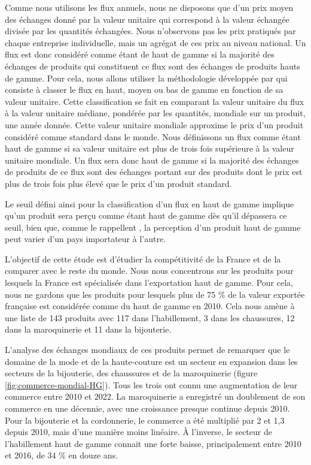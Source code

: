\documentclass[french,10pt,a4paper]{article}
\begin{document}
Comme nous utilisons les flux annuels, nous ne disposons que d'un prix moyen des échanges donné par la valeur unitaire qui correspond à la valeur échangée divisée par les quantités échangées. Nous n'observons pas les prix pratiqués par chaque entreprise individuelle, mais un agrégat de ces prix au niveau national. Un flux est donc considéré comme étant de haut de gamme si la majorité des échanges de produits qui constituent ce flux sont des échanges de produits hauts de gamme. Pour cela, nous allons utiliser la méthodologie développée par \cite{Fontagne1997} qui consiste à classer le flux en haut, moyen ou bas de gamme en fonction de sa valeur unitaire. Cette classification se fait en comparant la valeur unitaire du flux à la valeur unitaire médiane, pondérée par les quantités, mondiale sur un produit, une année donnée. Cette valeur unitaire mondiale approxime le prix d'un produit considéré comme standard dans le monde. Nous définissons un flux comme étant haut de gamme si sa valeur unitaire est plus de trois fois supérieure à la valeur unitaire mondiale. Un flux sera donc haut de gamme si la majorité des échanges de produits de ce flux sont des échanges portant sur des produits dont le prix est plus de trois fois plus élevé que le prix d'un produit standard.

Le seuil défini ainsi pour la classification d'un flux en haut de gamme implique qu'un produit sera perçu comme étant haut de gamme dès qu'il dépassera ce seuil, bien que, comme le rappellent \cite{Martin2015}, la perception d'un produit haut de gamme peut varier d'un pays importateur à l'autre. 

\medskip

L'objectif de cette étude est d'étudier la compétitivité de la France et de la comparer avec le reste du monde. Nous nous concentrons sur les produits pour lesquels la France est spécialisée dans l'exportation haut de gamme. Pour cela, nous ne gardons que les produits pour lesquels plus de 75 \% de la valeur exportée française est considérée comme du haut de gamme en 2010. Cela nous amène à une liste de 143 produits avec 117 dans l'habillement, 3 dans les chaussures, 12 dans la maroquinerie et 11 dans la bijouterie.

L'analyse des échanges mondiaux de ces produits permet de remarquer que le domaine de la mode et de la haute-couture est un secteur en expansion dans les secteurs de la bijouterie, des chaussures et de la maroquinerie (figure \ref{fig:commerce-mondial-HG}). Tous les trois ont connu une augmentation de leur commerce entre 2010 et 2022. La maroquinerie a enregistré un doublement de son commerce en une décennie, avec une croissance presque continue depuis 2010. Pour la bijouterie et la cordonnerie, le commerce a été multiplié par 2 et 1,3 depuis 2010, mais d'une manière moins linéaire. À l'inverse, le secteur de l'habillement haut de gamme connait une forte baisse, principalement entre 2010 et 2016, de 34 \% en douze ans. 
\end{document}
